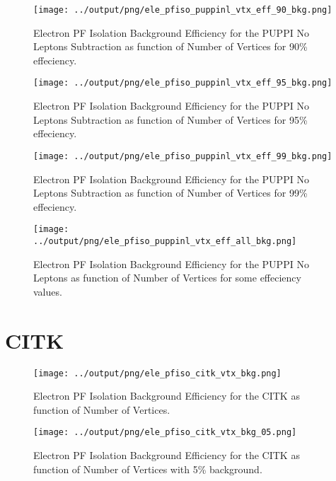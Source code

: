 \documentclass[11pt]{book}
\begin{document}
\begin{figure}[htb]
\centering
\texttt{[image: ../output/png/ele\_pfiso\_puppinl\_vtx\_eff\_90\_bkg.png]}
\caption{Electron PF Isolation Background Efficiency for the PUPPI No Leptons Subtraction as function of Number of Vertices for 90\% effeciency.}
\label{fig:ele_pfiso_vtx_eff_puppinl_eff_90_bkg}
\end{figure}

\begin{figure}[htb]
\centering
\texttt{[image: ../output/png/ele\_pfiso\_puppinl\_vtx\_eff\_95\_bkg.png]}
\caption{Electron PF Isolation Background Efficiency for the PUPPI No Leptons Subtraction as function of Number of Vertices for 95\% effeciency.}
\label{fig:ele_pfiso_vtx_eff_puppinl_eff_95_bkg}
\end{figure}

\begin{figure}[htb]
\centering
\texttt{[image: ../output/png/ele\_pfiso\_puppinl\_vtx\_eff\_99\_bkg.png]}
\caption{Electron PF Isolation Background Efficiency for the PUPPI No Leptons Subtraction as function of Number of Vertices for 99\% effeciency.}
\label{fig:ele_pfiso_vtx_eff_puppinl_eff_99_bkg}
\end{figure}

\begin{figure}[htb]
\centering
\texttt{[image: ../output/png/ele\_pfiso\_puppinl\_vtx\_eff\_all\_bkg.png]}
\caption{Electron PF Isolation Background Efficiency for the PUPPI No Leptons as function of Number of Vertices for some effeciency values.}
\label{fig:ele_pfiso_vtx_eff_puppinl_eff_all_bkg}
\end{figure}
\clearpage

\section{CITK}
\begin{figure}[htb]
\centering
\texttt{[image: ../output/png/ele\_pfiso\_citk\_vtx\_bkg.png]}
\caption{Electron PF Isolation Background Efficiency for the CITK as function of Number of Vertices.}
\label{fig:ele_pfiso_vtx_bkg_citk}
\end{figure}

\begin{figure}[htb]
\centering
\texttt{[image: ../output/png/ele\_pfiso\_citk\_vtx\_bkg\_05.png]}
\caption{Electron PF Isolation Background Efficiency for the CITK as function of Number of Vertices with 5\% background.}
\label{fig:ele_pfiso_vtx_bkg_citk_bkg_05}
\end{figure}
\end{document}
